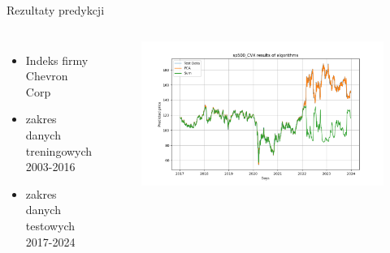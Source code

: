 \begin{frame}{Rezultaty predykcji}
    \begin{columns}[t]
            \begin{itemize}
                \item Indeks firmy Chevron Corp
                \item zakres danych treningowych 2003-2016
                \item zakres danych testowych 2017-2024
            \end{itemize}
        \centering
        \begin{figure}
            \centering
            \includegraphics[width=1\textwidth]{images/cvx_svm.png}
        \end{figure}    
    \end{columns}
\end{frame}

